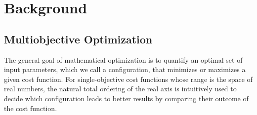 \documentclass{stdlocal}
\begin{document}
\section{Background} %
\label{sec:background}
  \subsection{Multiobjective Optimization} %
  \label{sub:multiobjective_optimization}
    The general goal of mathematical optimization is to quantify an optimal set of input parameters, which we call a configuration, that minimizes or maximizes a given cost function.
    For single-objective cost functions whose range is the space of real numbers, the natural total ordering of the real axis is intuitively used to decide which configuration leads to better results by comparing their outcome of the cost function.
\end{document}
